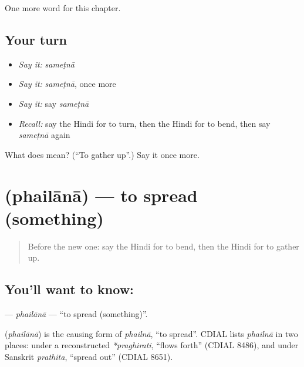 \begin{grammarlens}[title={What you've built}]
One more word for this chapter.
\end{grammarlens}

\subsection*{Your turn}
\begin{itemize}
\raggedright
  \item \emph{Say it:} \emph{sameṭnā}
  \item \emph{Say it:} \emph{sameṭnā}, once more
  \item \emph{Say it:} say \emph{sameṭnā}
  \item \emph{Recall:} say the Hindi for to turn, then the Hindi for to bend, then say \emph{sameṭnā} again
\end{itemize}

\begin{tcolorbox}[breakable,colback=teal!4,colframe=teal!35!black,title={Before you move on}]
What does  mean? (\textquotedblleft{}To gather up\textquotedblright{}.) Say it once more.
\end{tcolorbox}
\section[\texorpdfstring{\hi{फैलाना} (phailānā)}{फैलाना (phailānā)}]{ (phailānā) — to spread (something)}

\label{lesson:HI-C229-phailana}



\begin{quote}
Before the new one: say the Hindi for to bend, then the Hindi for to gather up.
\end{quote}

\subsection*{You'll want to know: }
\textbf{} — \emph{phailānā} — \textquotedblleft{}to spread (something)\textquotedblright{}.

\begin{cousinweb}
\textbf{} (\emph{phailānā}) is the causing form of \emph{phailnā}, \textquotedblleft{}to spread\textquotedblright{}. CDIAL lists \emph{phailnā} in two places: under a reconstructed \emph{*praghirati}, \textquotedblleft{}flows forth\textquotedblright{} (CDIAL 8486), and under Sanskrit \emph{prathita}, \textquotedblleft{}spread out\textquotedblright{} (CDIAL 8651).
\end{cousinweb}

